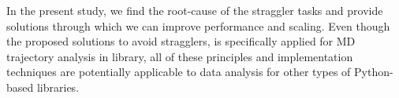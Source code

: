 In the present study, we find the root-cause of the straggler tasks and provide solutions through which we can improve performance and scaling.
Even though the proposed solutions to avoid stragglers, is specifically applied for MD trajectory analysis in  library, all of these principles and implementation techniques are potentially applicable to data analysis for other types of Python-based libraries.


